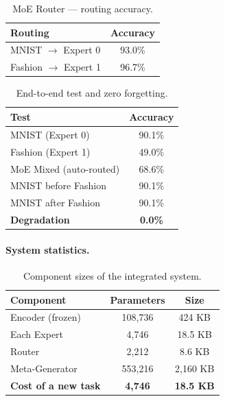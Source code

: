 \documentclass[11pt,a4paper]{report}
\begin{document}
\begin{table}[h!]
\centering
\caption{MoE Router --- routing accuracy.}
\begin{tabular}{l c}
\hline
\textbf{Routing} & \textbf{Accuracy} \\
\hline
MNIST $\to$ Expert 0 & 93.0\% \\
Fashion $\to$ Expert 1 & 96.7\% \\
\hline
\end{tabular}
\label{tab:integrated_router}
\end{table}

\begin{table}[h!]
\centering
\caption{End-to-end test and zero forgetting.}
\begin{tabular}{l c}
\hline
\textbf{Test} & \textbf{Accuracy} \\
\hline
MNIST (Expert 0) & 90.1\% \\
Fashion (Expert 1) & 49.0\% \\
MoE Mixed (auto-routed) & 68.6\% \\
\hline
MNIST before Fashion & 90.1\% \\
MNIST after Fashion & 90.1\% \\
\textbf{Degradation} & \textbf{0.0\%} \\
\hline
\end{tabular}
\label{tab:integrated_endtoend}
\end{table}

\paragraph{System statistics.}

\begin{table}[h!]
\centering
\caption{Component sizes of the integrated system.}
\begin{tabular}{l c c}
\hline
\textbf{Component} & \textbf{Parameters} & \textbf{Size} \\
\hline
Encoder (frozen) & 108,736 & 424 KB \\
Each Expert & 4,746 & 18.5 KB \\
Router & 2,212 & 8.6 KB \\
Meta-Generator & 553,216 & 2,160 KB \\
\textbf{Cost of a new task} & \textbf{4,746} & \textbf{18.5 KB} \\
\hline
\end{tabular}
\label{tab:integrated_sizes}
\end{table}
\end{document}
